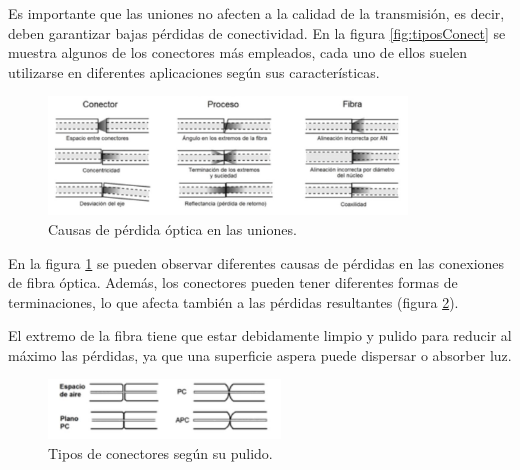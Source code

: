 \begin{itemize}
 		Es importante que las uniones no afecten a la calidad de la transmisión, es decir, deben garantizar bajas pérdidas de conectividad. En la figura \ref{fig:tiposConect} se muestra algunos de los conectores más empleados, cada uno de ellos suelen utilizarse en diferentes aplicaciones según sus características. %
 		\begin{figure}[H]
	 		\centering
	 		\includegraphics[width=0.85\textwidth]{./img/perdidasOpticas}
	 		\caption{Causas de pérdida óptica en las uniones. \cite{FOAconect}} 
	 		\label{fig:conectLoss}
		\end{figure}
 		En la figura \ref{fig:conectLoss} se pueden observar diferentes causas de pérdidas en las conexiones de fibra óptica. Además, los conectores pueden tener diferentes formas de terminaciones, lo que afecta también a las pérdidas resultantes (figura \ref{fig:tiposPulidos}).
 		
 		El extremo de la fibra tiene que estar debidamente limpio y pulido para reducir al máximo las pérdidas, ya que una superficie aspera puede dispersar o absorber luz.		
   		\begin{figure}[H]
   			\centering
   			\includegraphics[width=0.55\textwidth]{./img/conectoresPulido}
   			\caption{Tipos de conectores según su pulido. \cite{TipConectoresFO}} 
   			\label{fig:tiposPulidos}
   		\end{figure}


\end{itemize}
